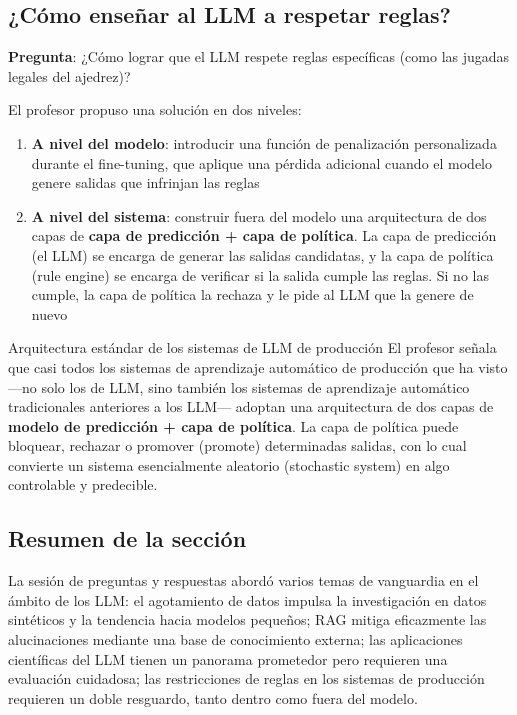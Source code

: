\subsection{¿Cómo enseñar al LLM a respetar reglas?}

\textbf{Pregunta}: ¿Cómo lograr que el LLM respete reglas específicas (como las jugadas legales del ajedrez)?

El profesor propuso una solución en dos niveles:

\begin{enumerate}
    \item \textbf{A nivel del modelo}: introducir una función de penalización personalizada durante el fine-tuning, que aplique una pérdida adicional cuando el modelo genere salidas que infrinjan las reglas
    \item \textbf{A nivel del sistema}: construir fuera del modelo una arquitectura de dos capas de \textbf{capa de predicción + capa de política}. La capa de predicción (el LLM) se encarga de generar las salidas candidatas, y la capa de política (rule engine) se encarga de verificar si la salida cumple las reglas. Si no las cumple, la capa de política la rechaza y le pide al LLM que la genere de nuevo
\end{enumerate}

\begin{knowledgebox}{Arquitectura estándar de los sistemas de LLM de producción}
El profesor señala que casi todos los sistemas de aprendizaje automático de producción que ha visto —no solo los de LLM, sino también los sistemas de aprendizaje automático tradicionales anteriores a los LLM— adoptan una arquitectura de dos capas de \textbf{modelo de predicción + capa de política}. La capa de política puede bloquear, rechazar o promover (promote) determinadas salidas, con lo cual convierte un sistema esencialmente aleatorio (stochastic system) en algo controlable y predecible.
\end{knowledgebox}

\subsection{Resumen de la sección}

La sesión de preguntas y respuestas abordó varios temas de vanguardia en el ámbito de los LLM: el agotamiento de datos impulsa la investigación en datos sintéticos y la tendencia hacia modelos pequeños; RAG mitiga eficazmente las alucinaciones mediante una base de conocimiento externa; las aplicaciones científicas del LLM tienen un panorama prometedor pero requieren una evaluación cuidadosa; las restricciones de reglas en los sistemas de producción requieren un doble resguardo, tanto dentro como fuera del modelo.

